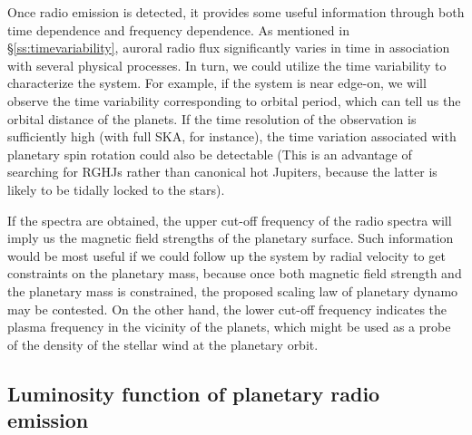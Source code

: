\documentclass[iop,numberedappendix,apj]{emulateapj}
\def\memoYF#1{\color{red}$[${\bf #1}$]$ \color{black}}
\begin{document}

Once radio emission is detected, it provides some useful information through both time dependence and frequency dependence. 
As mentioned in \S\ref{ss:timevariability}, auroral radio flux significantly varies in time in association with several physical processes. In turn, we could utilize the time variability to characterize the system. For example, if the system is near edge-on, we will observe the time variability corresponding to orbital period, which can tell us the orbital distance of the planets. 
If the time resolution of the observation is sufficiently high (with full SKA, for instance), the time variation associated with planetary spin rotation could also be detectable (This is an advantage of searching for RGHJs rather than canonical hot Jupiters, because the latter is likely to be tidally locked to the stars).  

If the spectra are obtained, the upper cut-off frequency of the radio spectra will imply us the magnetic field strengths of the planetary surface. Such information would be most useful if we could follow up the system by radial velocity to get constraints on the planetary mass, because once both magnetic field strength and the planetary mass is constrained, the proposed scaling law of planetary dynamo may be contested. 
On the other hand, the lower cut-off frequency indicates the plasma frequency in the vicinity of the planets, which might be used as a probe of the density of the stellar wind at the planetary orbit. 


\subsection{Luminosity function of planetary radio emission}
\label{ss:Lfunc}
\end{document}
